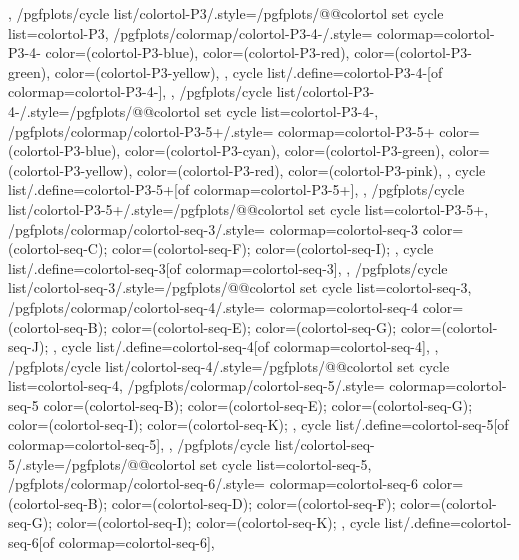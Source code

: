 {{  },
  /pgfplots/cycle list/colortol-P3/.style={/pgfplots/@@colortol set cycle list={colortol-P3}},
  /pgfplots/colormap/colortol-P3-4-/.style={
    colormap={colortol-P3-4-}{
      color=(colortol-P3-blue),
      color=(colortol-P3-red),
      color=(colortol-P3-green),
      color=(colortol-P3-yellow),
    },
    cycle list/.define={colortol-P3-4-}{[of colormap=colortol-P3-4-]},
  },
  /pgfplots/cycle list/colortol-P3-4-/.style={/pgfplots/@@colortol set cycle list={colortol-P3-4-}},
  /pgfplots/colormap/colortol-P3-5+/.style={
    colormap={colortol-P3-5+}{
      color=(colortol-P3-blue),
      color=(colortol-P3-cyan),
      color=(colortol-P3-green),
      color=(colortol-P3-yellow),
      color=(colortol-P3-red),
      color=(colortol-P3-pink),
    },
    cycle list/.define={colortol-P3-5+}{[of colormap=colortol-P3-5+]},
  },
  /pgfplots/cycle list/colortol-P3-5+/.style={/pgfplots/@@colortol set cycle list={colortol-P3-5+}},
  /pgfplots/colormap/colortol-seq-3/.style={
    colormap={colortol-seq-3}{
      color=(colortol-seq-C);
      color=(colortol-seq-F);
      color=(colortol-seq-I);
    },
    cycle list/.define={colortol-seq-3}{[of colormap=colortol-seq-3]},
  },
  /pgfplots/cycle list/colortol-seq-3/.style={/pgfplots/@@colortol set cycle list={colortol-seq-3}},
  /pgfplots/colormap/colortol-seq-4/.style={
    colormap={colortol-seq-4}{
      color=(colortol-seq-B);
      color=(colortol-seq-E);
      color=(colortol-seq-G);
      color=(colortol-seq-J);
    },
    cycle list/.define={colortol-seq-4}{[of colormap=colortol-seq-4]},
  },
  /pgfplots/cycle list/colortol-seq-4/.style={/pgfplots/@@colortol set cycle list={colortol-seq-4}},
  /pgfplots/colormap/colortol-seq-5/.style={
    colormap={colortol-seq-5}{
      color=(colortol-seq-B);
      color=(colortol-seq-E);
      color=(colortol-seq-G);
      color=(colortol-seq-I);
      color=(colortol-seq-K);
    },
    cycle list/.define={colortol-seq-5}{[of colormap=colortol-seq-5]},
  },
  /pgfplots/cycle list/colortol-seq-5/.style={/pgfplots/@@colortol set cycle list={colortol-seq-5}},
  /pgfplots/colormap/colortol-seq-6/.style={
    colormap={colortol-seq-6}{
      color=(colortol-seq-B);
      color=(colortol-seq-D);
      color=(colortol-seq-F);
      color=(colortol-seq-G);
      color=(colortol-seq-I);
      color=(colortol-seq-K);
    },
    cycle list/.define={colortol-seq-6}{[of colormap=colortol-seq-6]},
}}
